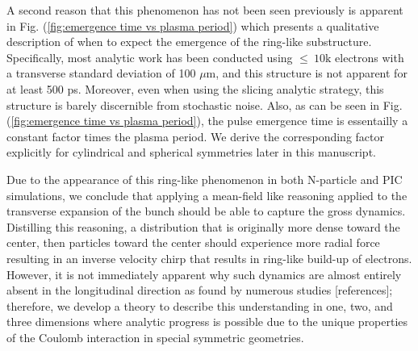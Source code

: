 \documentclass[aps,prl,twocolumn,showpacs,superscriptaddress,groupedaddress]{revtex4-1}  %
\begin{document}
{A second reason that this phenomenon has not been seen previously 
is apparent in Fig. (\ref{fig:emergence time vs plasma period}) which presents a qualitative description of
when to expect the emergence of the ring-like substructure.  Specifically, 
most analytic work has been conducted using $\le~10\text{k}$ electrons with a
transverse standard deviation of 100 $\mu$m, and this structure is
not apparent for at least 500 ps.  Moreover, even when using the slicing 
analytic strategy, this structure is barely discernible from stochastic noise.  Also, as can be seen
in Fig. (\ref{fig:emergence time vs plasma period}), the pulse emergence time is essentailly
a constant factor times the plasma period.  We derive
the corresponding factor explicitly for cylindrical and spherical symmetries later in this manuscript.


Due to the appearance of this ring-like phenomenon in both 
N-particle and PIC simulations, we conclude that applying a mean-field like reasoning 
applied to the transverse expansion of the bunch should be able to
capture the gross dynamics.  Distilling this reasoning, a distribution that is originally more dense 
toward the center, then particles toward the center should experience more radial force resulting in an inverse velocity chirp
that results in ring-like build-up of electrons.  However, it is not immediately apparent why such dynamics are almost
entirely absent in the 
longitudinal direction as found by numerous studies [references]; therefore, we develop a theory to describe this understanding in one, two, and three dimensions
where analytic progress is possible due to the unique properties of the Coulomb interaction in 
special symmetric geometries. 

}
\end{document}
